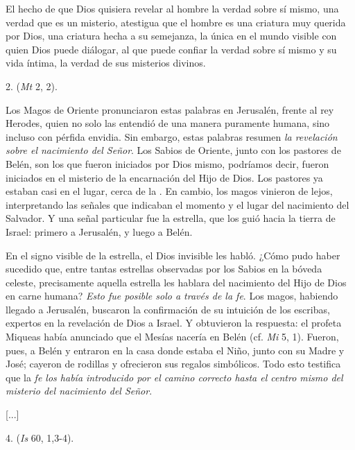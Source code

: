 \begin{body}
	El hecho de que Dios quisiera revelar al hombre la verdad sobre sí mismo, una verdad que es un misterio, atestigua que el hombre es una criatura muy querida por Dios, una criatura hecha a su semejanza, la única en el mundo visible con quien Dios puede diálogar, al que puede confiar la verdad sobre sí mismo y su vida íntima, la verdad de sus misterios divinos.
	
	2.  (\emph{Mt} 2, 2).
	
	Los Magos de Oriente pronunciaron estas palabras en Jerusalén, frente al rey Herodes, quien no solo las entendió de una manera puramente humana, sino incluso con pérfida envidia. Sin embargo, estas palabras resumen \emph{la revelación sobre el nacimiento del Señor}. Los Sabios de Oriente, junto con los pastores de Belén, son los que fueron iniciados por Dios mismo, podríamos decir, fueron iniciados en el misterio de la encarnación del Hijo de Dios. Los pastores ya estaban casi en el lugar, cerca de la . En cambio, los magos vinieron de lejos, interpretando las señales que indicaban el momento y el lugar del nacimiento del Salvador. Y una señal particular fue la estrella, que los guió hacia la tierra de Israel: primero a Jerusalén, y luego a Belén.
	
	En el signo visible de la estrella, el Dios invisible les habló. ¿Cómo pudo haber sucedido que, entre tantas estrellas observadas por los Sabios en la bóveda celeste, precisamente aquella estrella les hablara del nacimiento del Hijo de Dios en carne humana? \emph{Esto fue posible solo a través de la fe}. Los magos, habiendo llegado a Jerusalén, buscaron la confirmación de su intuición de los escribas, expertos en la revelación de Dios a Israel. Y obtuvieron la respuesta: el profeta Miqueas había anunciado que el Mesías nacería en Belén (cf. \emph{Mi} 5, 1). Fueron, pues, a Belén y entraron en la casa donde estaba el Niño, junto con su Madre y José; cayeron de rodillas y ofrecieron sus regalos simbólicos. Todo esto testifica que la \emph{fe los había introducido por el camino correcto hasta el centro mismo del misterio del nacimiento del Señor}.
	
	{[}...{]}
	
	4.  (\emph{Is} 60, 1,3-4).
	

\end{body}
